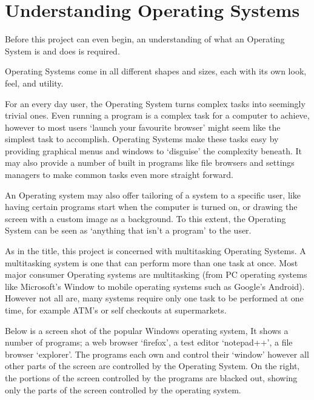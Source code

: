 \documentclass[a4paper]{report}
\begin{document}
\section{Understanding Operating Systems}


Before this project can even begin, an understanding of what an Operating System is and does is required.

Operating Systems come in all different shapes and sizes, each with its own look, feel, and utility.

For an every day user, the Operating System turns complex tasks into seemingly trivial ones. Even running a program is a complex task for a computer to achieve, however to most users `launch your favourite browser' might seem like the simplest task to accomplish. Operating Systems make these tasks easy by providing graphical menus and windows to `disguise' the complexity beneath. It may also provide a number of built in programs like file browsers and settings managers to make common tasks even more straight forward.

An Operating system may also offer tailoring of a system to a specific user, like having certain programs start when the computer is turned on, or drawing the screen with a custom image as a background. To this extent, the Operating System can be seen as `anything that isn't a program' to the user.

As in the title, this project is concerned with multitasking Operating Systems. A multitasking system is one that can perform more than one task at once. Most major consumer Operating systems are multitasking (from PC operating systems like Microsoft's Window to mobile operating systems such as Google's Android). However not all are, many systems require only one task to be performed at one time, for example ATM's or self checkouts at supermarkets.

Below is a screen shot of the popular Windows operating system, It shows a number of programs; a web browser `firefox', a test editor `notepad++', a file browser `explorer'. The programs each own and control their `window' however all other parts of the screen are controlled by the Operating System. On the right, the portions of the screen controlled by the programs are blacked out, showing only the parts of the screen controlled by the operating system.
\end{document}
